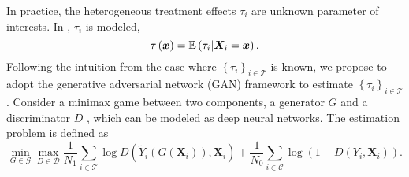 In practice, the heterogeneous treatment effects \(\tau _{i} \) are unknown parameter of interests. In \citet{wager/athey:2018:rf_hte}, \(\tau _{i} \) is modeled,
\[
    \tau \left( \bm{x} \right)  = \mathbb{E} \left( \tau _{i} \vert \bm{X}_{i} = \bm{x} \right).
\]
Following the intuition from the case where \(\left\{ \tau _{i}  \right\}_{i \in \mathcal{T} }\) is known, we propose to adopt the generative adversarial network (GAN) framework \citep{goodfellow:2014:GAN,kaji/manresa/pouliot:2022:adversarial_est} to estimate \(\left\{ \tau _{i}  \right\} _{i\in \mathcal{T} }\). Consider a minimax game between two components, a generator \(G\)  and a discriminator \(D\) , which can be modeled as deep neural networks. The estimation problem is defined as
\begin{equation}
    \min_{G\in \mathcal{G} } \max_{D \in \mathcal{D} } 
    \frac{1}{N_{1}} \sum_{i \in \mathcal{T} } 
        \log D\left( \tilde{Y} _{i} \left( G\left( \bm{X} _{i}  \right)  \right), \bm{X} _{i}  \right) + 
    \frac{1}{N_{0}} \sum_{i\in \mathcal{C} } \log \left( 
        1 - D\left( Y _{i} , \bm{X} _{i}  \right)
     \right).
\end{equation}

\newpage













